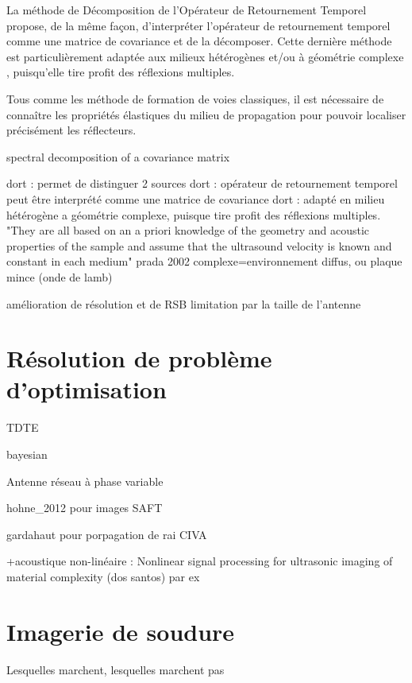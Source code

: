 La méthode de Décomposition de l'Opérateur de Retournement Temporel \citep{prada_2002} propose, de la même façon, d'interpréter l'opérateur de retournement temporel comme une matrice de covariance et de la décomposer. Cette dernière méthode est particulièrement adaptée aux milieux hétérogènes et/ou à géométrie complexe , puisqu'elle tire profit des réflexions multiples. 

Tous comme les méthode de formation de voies classiques, il est nécessaire de connaître les propriétés élastiques du milieu de propagation pour pouvoir localiser précisément les réflecteurs.


spectral decomposition of a covariance matrix

dort : permet de distinguer 2 sources
dort : opérateur de retournement temporel peut être interprété comme une matrice de covariance
dort : adapté en milieu hétérogène a géométrie complexe, puisque tire profit des réflexions multiples. "They are all based on an a priori
knowledge of the geometry and acoustic properties of the sample and assume that the ultrasound
velocity is known and constant in each medium" prada 2002 complexe=environnement diffus, ou plaque mince (onde de lamb)


amélioration de résolution et de RSB
limitation par la taille de l'antenne

\section{Résolution de problème d'optimisation}

TDTE

bayesian


Antenne réseau à phase variable



hohne\_2012 pour images SAFT


gardahaut pour porpagation de rai CIVA


+acoustique non-linéaire : Nonlinear signal processing for ultrasonic imaging of material complexity (dos santos) par ex

\section{Imagerie de soudure}
Lesquelles marchent, lesquelles marchent pas
